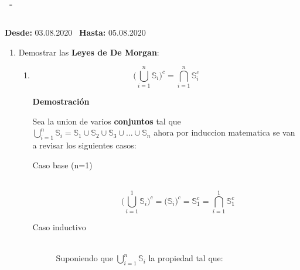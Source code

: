 \documentclass[a4paper,dvipsnames]{book}
\newcommand{\np}{\null\newpage}
\newenvironment{tarea}[3]
    {
        \null\newpage
        \begin{tcolorbox}
            \textbf{\asignatura\ -\ \autor}
            \subsection{\capitalisewords{#1}}

            \begin{flushright}
            \textbf{Desde:}  #2 \
            \textbf{Hasta:}  #3 \
            \end{flushright}
        \end{tcolorbox}

    \begin{enumerate}[{Ejercicio} 1.]
    }
    {
        \end{enumerate}
        \np
    }
\begin{document}
\begin{tarea}{Tarea Demostración de Lemas}{03.08.2020}{05.08.2020}
\begin{enumerate}
                \textbf{Demostración}

                Sea $\mathbb S$ un conjunto, entonces es necesario evealuar las
                siguientes situaciones:
                \begin{itemize}
                    \item Suponiendo que $x\in\left(\mathbb S\cap\Omega\right)$
                        como $\mathbb S\subseteq\Omega$ entonces de cualquier
                        forma $\forall x\in\mathbb S$ tambien $x\in\Omega$.
                        Pero $\nexist x$ talque $x\in\mathbb S^{c}$.

                    \item Suponiendo que $x\in\mathbb S$, y como $\mathbb
                        S\subseteq\Omega$ entonces $x\in\mathbb S\land
                        x\in\Omeg$ es decir $x\in\left(\mathbb
                        S\cap\Omega\right)$.
                \end{itemize}

                Ya que en ambos casos son verdaderos se ha demostrado que la
                proposición es verdadera. $\blacksquare$
            \end{enumerate}

        \item Demostrar las \textbf{Leyes de De Morgan}:
            \begin{enumerate}
                \item \[\Big(\bigcup_{i=1}^{n}\mathbb S_{i}\Big)^{c} = \bigcap_{i=1}^{n}\mathbb S_{i}^{c}\]

                \textbf{Demostración}

                Sea la union de varios \textbf{conjuntos} tal que
                    $\bigcup_{i=1}^{n}\mathbb S_{i}=\mathbb S_{1}\cup\mathbb
                    S_{2}\cup\mathbb S_{3}\cup...\cup\mathbb S_{n}$ ahora por
                    induccion matematica se van a revisar los siguientes casos:

                    \begin{description}
                        \item[Caso base (n=1)]\\
                        \begin{equation*}

                        \Big(\bigcup_{i=1}^{1}\mathbb S_{i}\Big)^{c} =
                            \Big(\mathbb S_{i}\Big)^{c} = \mathbb
                            S_{1}^{c}=\bigcap_{i=1}^{1}\mathbb S_{1}^{c}
                        \end{equation*}
                        \np
                        \item[Caso inductivo]\\
                            Suponiendo que $\bigcup_{i=1}^{n}\mathbb S_{i}$ la propiedad tal que:
                            \begin{equation*}


\end{equation*}
\end{description}
\end{enumerate}
\end{tarea}
\end{document}

